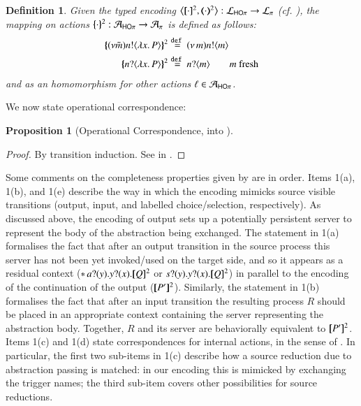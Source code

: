 \documentclass[preprint,11pt]{elsarticle}
\newtheorem{definition}{Definition}[section]
\newtheorem{proposition}{Proposition}[section]
\begin{document}
{%
\begin{definition}%
\label{d:actmap2}
Given the typed encoding 
$\enco{\map{\cdot}^{2}, \mapt{\cdot}^{2} %
}: \tyl{L}_{\HOp} \to \tyl{L}_{\sessp}$  (cf. ), 
the mapping on actions $\{\!\!\{\cdot\}\!\!\}^{2}: \mathcal{A}_{\mathsf{HO}\pi} \to \mathcal{A}_{\pi}$ is defined as follows:
	\begin{align*}
		\mapa{(\nu \tilde{m})\bactout{n}{\abs{ x}{P}} }^{2} & \defeq \news{m} \bactout{n}{m}
		\\
		\mapa{\bactinp{n}{\abs{ x}{P}} }^{2} & \defeq \bactinp{n}{m} \quad \quad m \text{ fresh}
	\end{align*}
	and as an homomorphism for other actions $\ell \in \mathcal{A}_{\mathsf{HO}\pi}$.
\end{definition}

We now state operational correspondence: %

\begin{proposition}[Operational Correspondence, \HOp into \sessp]\myrm
	\label{prop:op_corr_HOp_to_p}
	
	\end{proposition}

\begin{proof}
	\noi By transition induction.
	See  in 
	.
\end{proof}

Some comments on the completeness properties given by  are in order. Items 1(a), 1(b), and 1(e) describe the way in which 
the encoding mimicks source visible transitions (output, input, and labelled choice/selection, respectively). 
As discussed above, the encoding of output 
sets up a potentially persistent server to represent the body of the abstraction being exchanged. 
The statement in 1(a) formalises the fact that 
after an output transition in the source process this server has not been yet invoked/used on the target side, and so it appears as a
residual context ($\ast\,{} a ? (y) . y ? (x) . [\!\![Q]\!\!]^2$ or $s ? (y) . y ? (x) . [\!\![Q]\!\!]^2$)
in parallel to the encoding of the continuation of the output ($[\!\![P']\!\!]^2$).
Similarly, the statement in 1(b) formalises the fact that after an input transition the resulting process $R$ should be 
placed in an appropriate context containing the server representing the abstraction body. 
Together, $R$ and its server are behaviorally equivalent to $[\!\![P']\!\!]^2$.
Items 1(c) and 1(d) state correspondences for internal actions, in the sense of .
In particular, the first two sub-items in 1(c) describe how a source reduction due to abstraction passing is matched: in our encoding
this is mimicked by exchanging the trigger names; the third sub-item covers other possibilities for source reductions. 

}
\end{document}
